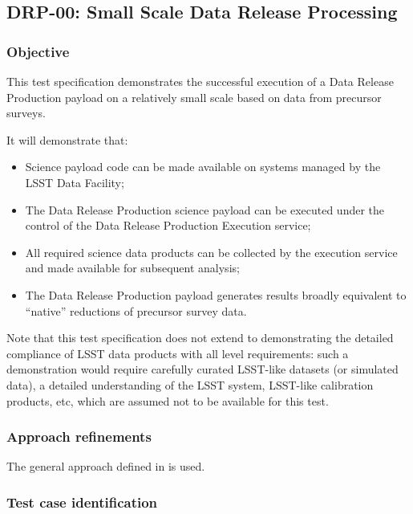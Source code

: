 \subsection{DRP-00: Small Scale Data Release Processing}
\label{drp-00}

\subsubsection{Objective}

This test specification demonstrates the successful execution of a Data
Release Production payload on a relatively small scale based on data from
precursor surveys.

It will demonstrate that:

\begin{itemize}

  \item{Science payload code can be made available on systems managed by the
  LSST Data Facility;}

  \item{The Data Release Production science payload can be executed under the
  control of the Data Release Production Execution service;}

  \item{All required science data products can be collected by the execution
  service and made available for subsequent analysis;}

  \item{The Data Release Production payload generates results broadly
  equivalent to ``native'' reductions of precursor survey data.}

\end{itemize}

Note that this test specification does not extend to demonstrating the
detailed compliance of LSST data products with all  level requirements: such a demonstration would
require carefully curated LSST-like datasets (or simulated data), a detailed
understanding of the LSST system, LSST-like calibration products, etc, which
are assumed not to be available for this test.

\subsubsection{Approach refinements}

The general approach defined in  is used.

\subsubsection{Test case identification}

